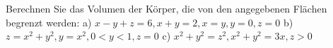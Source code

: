 \documentclass{article}%
\begin{document}



Berechnen Sie das Volumen der Körper, die von den angegebenen Flächen begrenzt werden:
a) $x-y+z=6, x+y=2, x=y, y=0, z=0$
b) $z=x^2+y^2, y=x^2, 0<y<1, z=0$
c) $x^2+y^2=z^2, x^2+y^2=3 x, z>0$
\end{document}
